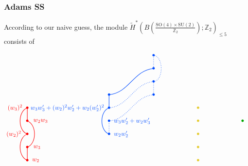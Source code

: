 \documentclass[12pt]{article}
\numberwithin{equation}{section}
\newcommand*{\colorA}[1]{\textcolor{colorA}{#1}}
\newcommand*{\colorB}[1]{\textcolor{colorB}{#1}}
\newcommand*{\colorC}[1]{\textcolor{colorC}{#1}}
\newcommand*{\colorD}[1]{\textcolor{colorD}{#1}}
\let\tilde\widetilde
\def\bZ{\mathbb{Z}}
\def\SU{\mathrm{SU}}
\def\SO{\mathrm{SO}}
\begin{document}
\subsubsection{Adams SS}
According to our naive guess, the module $\tilde H^\ast(B\left(\tfrac{\SO(4)\times \SU(2)}{\bZ_2}\right);\bZ_2)_{\leq 5}$ consists of
\begin{equation}
	\begin{tikzpicture}[thick,baseline=(m-2-4.south)]
		\matrix (m) [
			matrix of math nodes,
			row sep= 1em,
			column sep=6em,
		]{
			&&& \colorB{\bullet}\\
			&&& \colorB{\bullet}\\
			&&& \colorB{\bullet}\\
			&& \colorB{\bullet} & \colorB{\bullet}\\
			\colorA{\bullet} && \colorB{\bullet} && \colorC{\bullet}\\
		    \colorA{\bullet} && \colorB{\bullet} && \colorC{\bullet} & \colorD{\bullet}\\
			\colorA{\bullet} && \colorB{\bullet} && \colorC{\bullet}\\
			\colorA{\bullet} &&&& \colorC{\bullet}\\
			\colorA{\bullet} &&&& \colorC{\bullet}\\
		};
		\draw[colorA] (m-7-1.center) to [out=200, in=160] (m-9-1.center);
		\draw[colorA] (m-9-1.center) to (m-8-1.center);
		\draw[colorA] (m-5-1.center) to [out=200, in=160] (m-7-1.center);
		\draw[colorA] (m-6-1.center) to (m-5-1.center);
		\draw[colorA] (m-6-1.center) to [out=340, in=20] (m-8-1.center);
		\node[colorA, right=4pt] at (m-9-1) {$w_2$};
		\node[colorA, right=6pt] at (m-8-1) {$w_3$};
		\node[colorA, left=6pt] at (m-7-1) {$(w_2)^2$};
		\node[colorA, right=6pt] at (m-6-1) {$w_2w_3$};
		\node[colorA, left=4pt] at (m-5-1) {$(w_3)^2$};
		\draw[colorB] (m-7-3.center) to [out=160, in=200] (m-5-3.center);
		\draw[colorB, dotted] (m-7-3.center) to (m-6-3.center);
		\draw[colorB, dotted] (m-6-3.center) to [out=5, in=185] (m-4-4.center);
		\draw[colorB] (m-5-3.center) to (m-4-3.center);
		\draw[colorB, dotted] (m-5-3.center) to [out=5, in=185] (m-3-4.center);
		\draw[colorB, dotted] (m-4-4.center) to (m-3-4.center);
		\draw[colorB] (m-4-3.center) to [out=5, in=185] (m-2-4.center);
		\draw[colorB, dotted] (m-2-4.center) to (m-1-4.center);
		\draw[colorB, dotted] (m-3-4.center) to [out=5, in=355] (m-1-4.center);
		\node[colorB, right=4pt] at (m-7-3) {$w_2w'_2$};
		\node[colorB, right=4pt] at (m-6-3) {$w_3w'_2 + w_2w'_3$};
		\node[colorB, left=4pt] at (m-5-3) {$w_3w'_3 + (w_2)^2w'_2 + w_2(w'_2)^2$};

\end{tikzpicture}
\end{equation}
\end{document}
